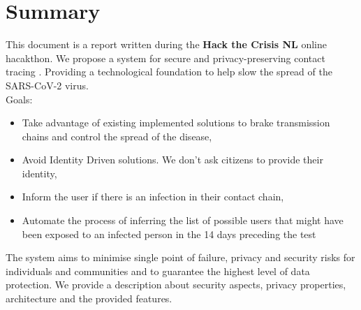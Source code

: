 {\color{PineGreen}\section{Summary}}

This document is a report written during the \textbf{Hack the Crisis NL} online hacakthon\cite{bib1}. We propose a system for secure and privacy-preserving contact tracing . Providing a technological foundation to help slow the spread of the SARS-CoV-2 virus.\\

Goals:
\begin{itemize}
\item Take advantage of existing implemented solutions to brake transmission chains and control the spread of the disease,
\item Avoid Identity Driven solutions. We don't ask citizens to provide their identity,
\item Inform the user if there is an infection in their contact chain,
\item Automate the process of inferring the list of possible users that might have been exposed to an infected person in the 14 days preceding the test
\end{itemize} 

The system aims to minimise single point of failure, privacy and security risks for individuals and communities and to guarantee the highest level of data protection.
We provide a description about security aspects, privacy properties, architecture and the provided features. 
\\


